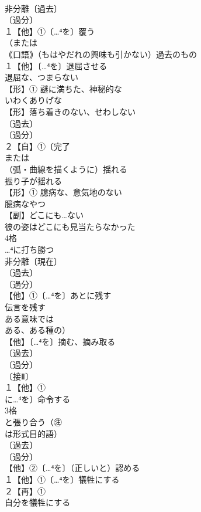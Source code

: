 \documentclass[8pt]{extreport}
\begin{document}
\begin{CJK}{UTF8}{min}
\\	非分離〔過去〕
\\	〔過分〕
\\	１【他】①〔…⁴を〕覆う 
\\	（または
\\	｟口語｠（もはやだれの興味も引かない）過去のもの
\\	１【他】〔…⁴を〕退屈させる 
\\	退屈な、つまらない
\\	【形】① 謎に満ちた、神秘的な 
\\	いわくありげな
\\	【形】落ち着きのない、せわしない 
\\	〔過去〕
\\	〔過分〕
\\	２【自】①〔完了
\\	または
\\	（弧・曲線を描くように）揺れる 
\\	振り子が揺れる
\\	【形】① 臆病な、意気地のない 
\\	臆病なやつ
\\	【副】どこにも…ない 
\\	彼の姿はどこにも見当たらなかった
\\	4格 
\\	…⁴に打ち勝つ
\\	非分離〔現在〕
\\	〔過去〕
\\	〔過分〕
\\	【他】①〔…⁴を〕あとに残す 
\\	伝言を残す
\\	ある意味では 
\\	ある、ある種の）
\\	【他】〔…⁴を〕摘む、摘み取る 
\\	〔過去〕
\\	〔過分〕
\\	〔接Ⅱ〕
\\	１【他】①
\\	に…⁴を〕命令する 
\\	3格 
\\	と張り合う（㊟
\\	は形式目的語）
\\	〔過去〕
\\	〔過分〕
\\	【他】②〔…⁴を〕（正しいと）認める
\\	１【他】①〔…⁴を〕犠牲にする 
\\	２【再】①
\\	自分を犠牲にする

\end{CJK}
\end{document}

